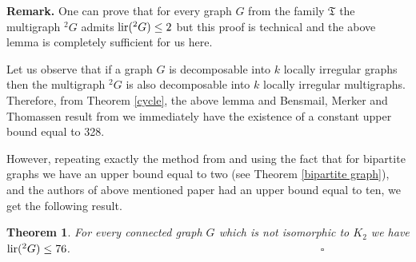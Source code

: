 \documentclass[12pt]{article}
\newtheorem{tw}{Theorem}
\begin{document}
\textbf{Remark.} One can prove that for every graph $G$ from the family $\mathfrak{T}$ the multigraph $^2G$ admits ${\rm lir}(^2G)\leq 2$ but this proof is technical and the above lemma is completely sufficient for us here.

Let us observe that if a graph $G$ is decomposable into $k$ locally irregular graphs then the multigraph $^2G$ is also decomposable into $k$ locally irregular multigraphs. Therefore, from Theorem \ref{cycle}, the above lemma and Bensmail, Merker and Thomassen result from \cite{Bensmail Merker Thomassen} we immediately have the existence of a constant upper bound equal to 328. 

However, repeating exactly the method from \cite{Bensmail Merker Thomassen} and using the fact that for bipartite graphs we have an upper bound equal to two (see Theorem \ref{bipartite graph}), and the authors of above mentioned paper had an upper bound equal to ten, we get the following result.

\begin{tw}
For every connected graph $G$ which is not isomorphic to $K_2$ we have ${\rm lir}(^2G)\leq 76$.  $\quad\quad\quad\quad\quad\quad\quad\quad\quad\quad\quad\quad\quad\quad\quad\quad\quad\quad\quad\quad\quad\quad \square$
\end{tw}
\end{document}
